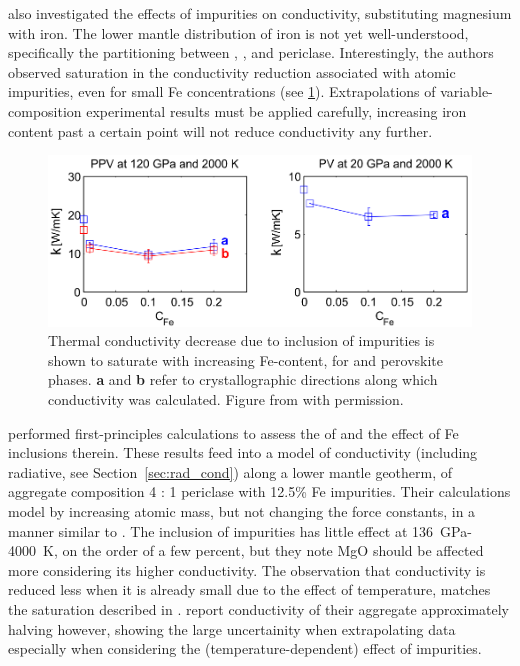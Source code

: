 \citet{Ammann2014} also investigated the effects of impurities on conductivity, substituting magnesium with iron. The lower mantle distribution of iron is not yet well-understood, specifically the partitioning between \bdg, \ppv, and periclase. Interestingly, the authors observed saturation in the conductivity reduction associated with atomic impurities, even for small Fe concentrations (see \ref{fig:ammann_sat}). Extrapolations of variable-composition experimental results must be applied carefully, increasing iron content past a certain point will not reduce conductivity any further.

\begin{figure}[h!]
  \includegraphics[width=\linewidth]{Figures/ammann_saturation.png}
  \caption[Thermal conductivity against Fe-content]{Thermal conductivity decrease due to inclusion of impurities is shown to saturate with increasing Fe-content, for \mgsios \ppv and perovskite phases. \textbf{a} and \textbf{b} refer to crystallographic directions along which conductivity was calculated. Figure from \citet{Ammann2014} with permission.}
  \label{fig:ammann_sat}
\end{figure}

\citet{Tang2014} performed first-principles calculations to assess the \tcs of \mgsios and the effect of Fe inclusions therein. These results feed into a model of conductivity (including radiative, see Section~\ref{sec:rad_cond}) along a lower mantle geotherm, of aggregate composition 4 \bdg : 1 periclase with 12.5\% Fe impurities. Their calculations model \mgfesios by increasing atomic mass, but not changing the force constants, in a manner similar to \citet{Ammann2014}. The inclusion of impurities has little effect at 136~GPa-4000~K, on the order of a few percent, but they note MgO should be affected more considering its higher conductivity. The observation that conductivity is reduced less when it is already small due to the effect of temperature, matches the saturation described in \citet{Ammann2014}. \citet{Haigis2012} report conductivity of their aggregate approximately halving however, showing the large uncertainity when extrapolating data especially when considering the (temperature-dependent) effect of impurities.



